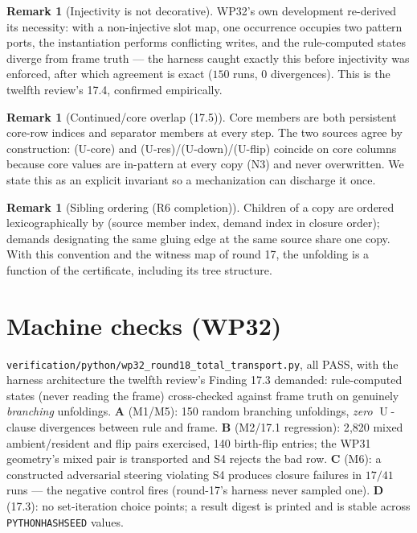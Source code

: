 \documentclass[11pt]{article}
\theoremstyle{definition}
\newtheorem{remark}[theorem]{Remark}
\newcommand{\U}{\operatorname{U}}
\newcommand{\code}[1]{\texttt{#1}}
\begin{document}
\begin{remark}[Injectivity is not decorative]
WP32's own development re-derived its necessity: with a non-injective
slot map, one occurrence occupies two pattern ports, the instantiation
performs conflicting writes, and the rule-computed states diverge from
frame truth --- the harness caught exactly this before injectivity was
enforced, after which agreement is exact ($150$ runs, $0$
divergences).  This is the twelfth review's 17.4, confirmed
empirically.
\end{remark}

\begin{remark}[Continued/core overlap (17.5)]
Core members are both persistent core-row indices and separator
members at every step.  The two sources agree by construction:
(U-core) and (U-res)/(U-down)/(U-flip) coincide on core columns because
core values are in-pattern at every copy (N3) and never overwritten.
We state this as an explicit invariant so a mechanization can discharge
it once.
\end{remark}

\begin{remark}[Sibling ordering (R6 completion)]
Children of a copy are ordered lexicographically by (source member
index, demand index in closure order); demands designating the same
gluing edge at the same source share one copy.  With this convention
and the witness map of round 17, the unfolding is a function of the
certificate, including its tree structure.
\end{remark}

\section{Machine checks (WP32)}\label{sec:wp}

\code{verification/python/wp32\_round18\_total\_transport.py}, all
PASS, with the harness architecture the twelfth review's Finding 17.3
demanded: rule-computed states (never reading the frame) cross-checked
against frame truth on genuinely \emph{branching} unfoldings.
\textbf{A} (M1/M5): 150 random branching unfoldings, \emph{zero}
$\U$-clause divergences between rule and frame.
\textbf{B} (M2/17.1 regression): 2{,}820 mixed ambient/resident and
flip pairs exercised, 140 birth-flip entries; the WP31 geometry's mixed
pair is transported and S4 rejects the bad row.
\textbf{C} (M6): a constructed adversarial steering violating S4
produces closure failures in $17/41$ runs --- the negative control
fires (round-17's harness never sampled one).
\textbf{D} (17.3): no set-iteration choice points; a result digest is
printed and is stable across \code{PYTHONHASHSEED} values.
\end{document}
